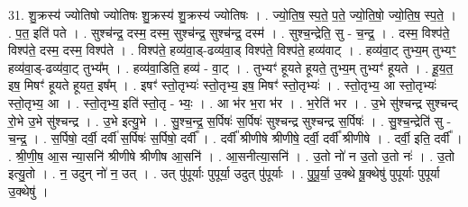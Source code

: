 \documentclass[17pt]{extarticle}
\begin{document}
31. शु॒क्रस्य॑ ज्योतिषो ज्योतिषः शु॒क्रस्य॑ शु॒क्रस्य॑ ज्योतिषः । . ज्यो॒ति॒ष॒ स्प॒ते॒ प॒ते॒ ज्यो॒ति॒षो॒ ज्यो॒ति॒ष॒ स्प॒ते॒ । . प॒त॒ इति॑ पते । . सुश्च॑न्द्र॒ दस्म॒ दस्म॒ सुश्च॑न्द्र॒ सुश्च॑न्द्र॒ दस्म॑ । . सुश्च॒न्द्रेति॒ सु - च॒न्द्र॒ । . दस्म॒ विश्प॑ते॒ विश्प॑ते॒ दस्म॒ दस्म॒ विश्प॑ते । . विश्प॑ते॒ हव्य॑वा॒ड्-ढव्य॑वा॒ड् विश्प॑ते॒ विश्प॑ते॒ हव्य॑वाट् । . हव्य॑वा॒ट् तुभ्य॒म् तुभ्यꣳ॒॒ हव्य॑वा॒ड्-ढव्य॑वा॒ट् तुभ्य᳚म् । . हव्य॑वा॒डिति॒ हव्य॑ - वा॒ट् । . तुभ्यꣳ॑ हूयते हूयते॒ तुभ्य॒म् तुभ्यꣳ॑ हूयते । . हू॒य॒त॒ इष॒ मिषꣳ॑ हूयते हूयत॒ इष᳚म् । . इषꣳ॑ स्तो॒तृभ्यः॑ स्तो॒तृभ्य॒ इष॒ मिषꣳ॑ स्तो॒तृभ्यः॑ । . स्तो॒तृभ्य॒ आ स्तो॒तृभ्यः॑ स्तो॒तृभ्य॒ आ । . स्तो॒तृभ्य॒ इति॑ स्तो॒तृ - भ्यः॒ । . आ भ॑र भ॒रा भ॑र । . भ॒रेति॑ भर । . उ॒भे सु॑श्चन्द्र सुश्चन्द् रो॒भे उ॒भे सु॑श्चन्द्र । . उ॒भे इत्यु॒भे । . सु॒श्च॒न्द्र॒ स॒र्पिषः॑ स॒र्पिषः॑ सुश्चन्द्र सुश्चन्द्र स॒र्पिषः॑ । . सु॒श्च॒न्द्रेति॑ सु - च॒न्द्र॒ । . स॒र्पिषो॒ दर्वी॒ दर्वी॑ स॒र्पिषः॑ स॒र्पिषो॒ दर्वी᳚ । . दर्वी᳚ श्रीणीषे श्रीणीषे॒ दर्वी॒ दर्वी᳚ श्रीणीषे । . दर्वी॒ इति॒ दर्वी᳚ । . श्री॒णी॒ष॒ आ॒स न्या॒सनि॑ श्रीणीषे श्रीणीष आ॒सनि॑ । . आ॒सनीत्या॒सनि॑ । . उ॒तो नो॑ न उ॒तो उ॒तो नः॑ । . उ॒तो इत्यु॒तो । . न॒ उदुन् नो॑ न॒ उत् । . उत् पु॑पूर्याः पुपूर्या॒ उदुत् पु॑पूर्याः । . पु॒पू॒र्या॒ उ॒क्थे षू॒क्थेषु॑ पुपूर्याः पुपूर्या उ॒क्थेषु॑ । \newline
\end{document}
